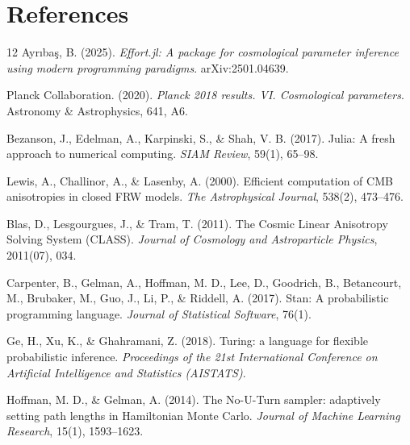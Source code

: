 \documentclass[11pt]{article}
\begin{document}
\section*{References}
\begin{thebibliography}{12}
Ayr\i ba\c{s}, B. (2025).
\textit{Effort.jl: A package for cosmological parameter inference using modern programming paradigms}.
arXiv:2501.04639.

Planck Collaboration. (2020).
\textit{Planck 2018 results. VI. Cosmological parameters}.
Astronomy \& Astrophysics, 641, A6.

Bezanson, J., Edelman, A., Karpinski, S., \& Shah, V. B. (2017).
Julia: A fresh approach to numerical computing.
\textit{SIAM Review}, 59(1), 65--98.

Lewis, A., Challinor, A., \& Lasenby, A. (2000).
Efficient computation of CMB anisotropies in closed FRW models.
\textit{The Astrophysical Journal}, 538(2), 473--476.

Blas, D., Lesgourgues, J., \& Tram, T. (2011).
The Cosmic Linear Anisotropy Solving System (CLASS).
\textit{Journal of Cosmology and Astroparticle Physics}, 2011(07), 034.

Carpenter, B., Gelman, A., Hoffman, M. D., Lee, D., Goodrich, B., Betancourt, M., Brubaker, M., Guo, J., Li, P., \& Riddell, A. (2017).
Stan: A probabilistic programming language.
\textit{Journal of Statistical Software}, 76(1).

Ge, H., Xu, K., \& Ghahramani, Z. (2018).
Turing: a language for flexible probabilistic inference.
\textit{Proceedings of the 21st International Conference on Artificial Intelligence and Statistics (AISTATS)}.

Hoffman, M. D., \& Gelman, A. (2014).
The No-U-Turn sampler: adaptively setting path lengths in Hamiltonian Monte Carlo.
\textit{Journal of Machine Learning Research}, 15(1), 1593--1623.
\end{thebibliography}
\end{document}
